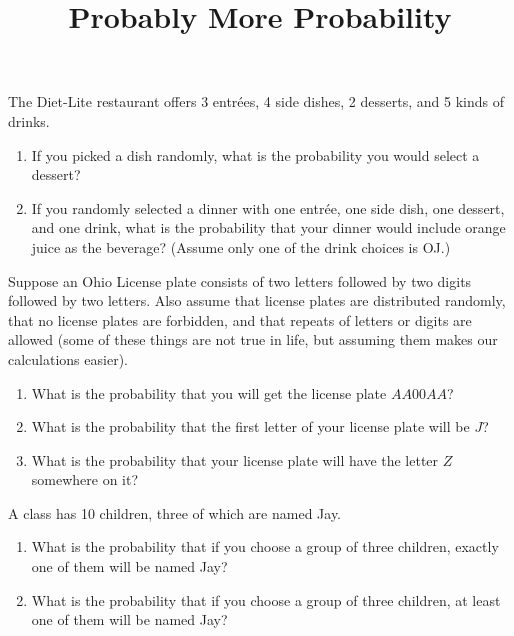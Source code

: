 \documentclass[handout,nooutcomes, noauthor]{ximera}
\title{Probably More Probability}
\begin{document}
\begin{abstract}
\end{abstract}
\maketitle

\begin{problem}
The Diet-Lite restaurant offers 3 entr\'{e}es, 4 side dishes, 2 desserts, and 5 kinds of drinks.
\begin{enumerate}
    \item If you picked a dish randomly, what is the probability you would select a dessert?
    \item If you randomly selected a dinner with one entr\'{e}e, one side dish, one dessert, and one drink, what is the probability that your dinner would include orange juice as the beverage? (Assume only one of the drink choices is OJ.)
\end{enumerate}
\vfill
\end{problem}


\begin{problem}
Suppose an Ohio License plate consists of two letters followed by two digits followed by two letters. Also assume that license plates are distributed randomly, that no license plates are forbidden, and that repeats of letters or digits are allowed (some of these things are not true in life, but assuming them makes our calculations easier).
\begin{enumerate}
    \item What is the probability that you will get the license plate $AA00AA$?
    \item What is the probability that the first letter of your license plate will be $J$?
    \item What is the probability that your license plate will have the letter $Z$ somewhere on it?
\end{enumerate}
\vfill
\end{problem}

\newpage
\begin{problem}
A class has 10 children, three of which are named Jay.  
\begin{enumerate}
\item What is the probability that if you choose a group of three children, exactly one of them will be named Jay?
\item What is the probability that if you choose a group of three children, at least one of them will be named Jay?
\end{enumerate}
\vfill
\end{problem}
\end{document}
